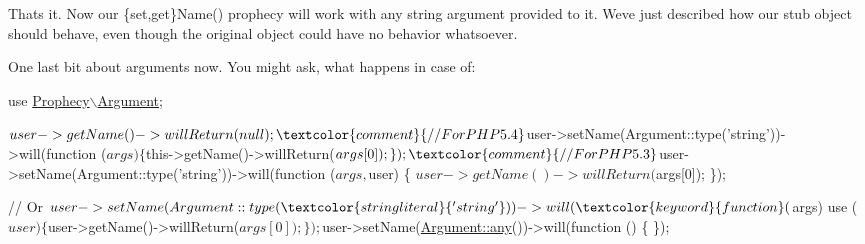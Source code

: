 

That\textquotesingle{}s it. Now our {\ttfamily \{set,get\}Name()} prophecy will work with any string argument provided to it. We\textquotesingle{}ve just described how our stub object should behave, even though the original object could have no behavior whatsoever.

One last bit about arguments now. You might ask, what happens in case of\+:


\begin{DoxyCode}
use \mbox{\hyperlink{namespace_prophecy_1_1_argument}{Prophecy\(\backslash\)Argument}};

$user->getName()->willReturn(null);

\textcolor{comment}{// For PHP 5.4}
$user->setName(Argument::type(\textcolor{stringliteral}{'string'}))->will(\textcolor{keyword}{function} ($args) \{
    $this->getName()->willReturn($args[0]);
\});

\textcolor{comment}{// For PHP 5.3}
$user->setName(Argument::type(\textcolor{stringliteral}{'string'}))->will(\textcolor{keyword}{function} ($args, $user) \{
    $user->getName()->willReturn($args[0]);
\});

\textcolor{comment}{// Or}
$user->setName(Argument::type(\textcolor{stringliteral}{'string'}))->will(\textcolor{keyword}{function} ($args) use ($user) \{
    $user->getName()->willReturn($args[0]);
\});

$user->setName(\mbox{\hyperlink{_functions_8php_aa950afcee01981fe0485ce00ff0e8e8c}{Argument::any}}())->will(\textcolor{keyword}{function} () \{
\});
\end{DoxyCode}


